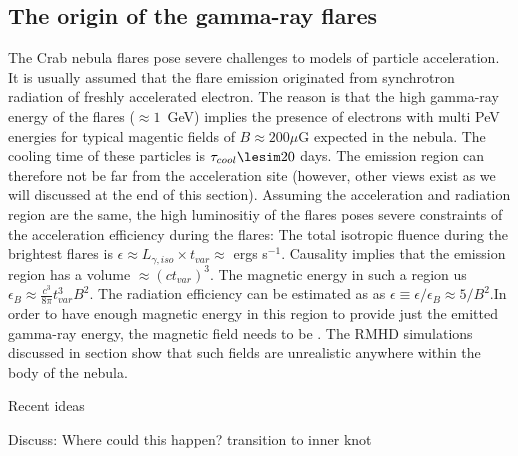 \subsection{The origin of the gamma-ray flares}

The Crab nebula flares pose severe challenges to models of particle acceleration. It is usually assumed that the flare emission originated from synchrotron radiation of freshly accelerated electron. The reason is that the high gamma-ray energy of the flares ($\approx 1$~GeV) implies the presence of electrons with multi PeV energies for typical magentic fields of $B \approx 200 \mu$G expected in the nebula. The cooling time of these particles is $\tau_{cool} \lesim 20$ days. The emission region can therefore not be far from the acceleration site (however, other views exist as we will discussed at the end of this section). Assuming the acceleration and radiation region are the same, the high luminositiy of the flares poses severe constraints of the acceleration efficiency during the flares: The total isotropic fluence during the brightest flares is $\epsilon \approx L_{\gamma,iso} \times t_{var} \approx $ ergs s$^{-1}$. Causality implies that the emission region has a volume $\approx (c t_{var})^3$. The magnetic energy in such a region us $\epsilon_B \approx \frac{c^3}{8 \pi} t_{var}^3 B^2$. The radiation efficiency can be estimated as as $\epsilon \equiv \epsilon / \epsilon_B \approx  5 / B^2$.In order to have enough magnetic energy in this region to provide just the emitted gamma-ray energy, the magnetic field needs to be . The RMHD simulations discussed in section show that such fields are unrealistic anywhere within the body of the nebula. 


Recent ideas  \cite{Bykov_2012}\cite{Cerutti_2014}\cite{2016arXiv160403179Y}\cite{2015arXiv151205426Z}\cite{2016arXiv160304850N}\cite{2016arXiv160305731L}

Discuss: Where could this happen? transition to inner knot